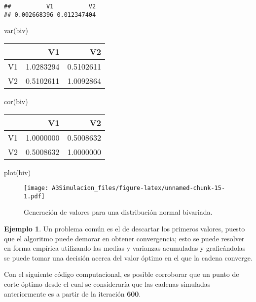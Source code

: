 \documentclass[
  12pt,
  spanish,
]{book}
\newenvironment{Shaded}{\begin{snugshade}}{\end{snugshade}}
\newcommand{\FunctionTok}[1]{\textcolor[rgb]{0.00,0.00,0.00}{#1}}
\newcommand{\NormalTok}[1]{#1}
\theoremstyle{definition}
\theoremstyle{definition}
\newtheorem{example}{Ejemplo}[chapter]
\theoremstyle{definition}
\theoremstyle{definition}
\theoremstyle{remark}
\begin{document}
\begin{verbatim}
##          V1          V2 
## 0.002668396 0.012347404
\end{verbatim}

\begin{Shaded}
\begin{Highlighting}[]
\FunctionTok{var}\NormalTok{(biv)}
\end{Highlighting}
\end{Shaded}

\begin{tabular}{l|r|r}
\hline
  & V1 & V2\\
\hline
V1 & 1.0283294 & 0.5102611\\
\hline
V2 & 0.5102611 & 1.0092864\\
\hline
\end{tabular}

\begin{Shaded}
\begin{Highlighting}[]
\FunctionTok{cor}\NormalTok{(biv)}
\end{Highlighting}
\end{Shaded}

\begin{tabular}{l|r|r}
\hline
  & V1 & V2\\
\hline
V1 & 1.0000000 & 0.5008632\\
\hline
V2 & 0.5008632 & 1.0000000\\
\hline
\end{tabular}

\begin{Shaded}
\begin{Highlighting}[]
\FunctionTok{plot}\NormalTok{(biv)}
\end{Highlighting}
\end{Shaded}

\begin{figure}
\centering
\texttt{[image: A3Simulacion\_files/figure-latex/unnamed-chunk-15-1.pdf]}
\caption{\label{fig:unnamed-chunk-15}Generación de valores para una distribución normal bivariada.}
\end{figure}

\begin{example}
\protect\hypertarget{exm:unnamed-chunk-16}{}{\label{exm:unnamed-chunk-16} }Un problema común es el de descartar los primeros valores, puesto que el algoritmo puede demorar en obtener convergencia;
esto se puede resolver en forma empírica utilizando las medias y varianzas acumuladas y graficándolas se puede tomar una decisión acerca del valor óptimo en el que la cadena converge.

Con el siguiente código computacional, es posible corroborar que un punto de corte óptimo desde el cual se consideraría que las cadenas simuladas anteriormente es a partir de la iteración \textbf{600}.
\end{example}
\end{document}
